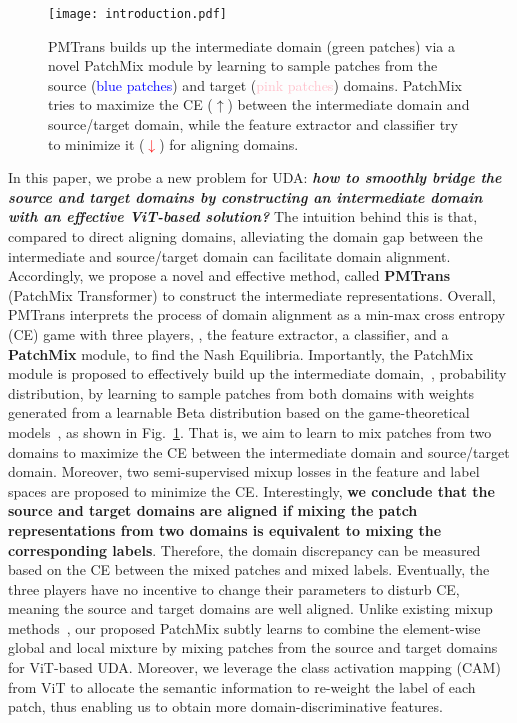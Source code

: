\documentclass[10pt,twocolumn,letterpaper, ]{article}
\begin{document}
\begin{figure}
    \centering
    \texttt{[image: introduction.pdf]}
    \captionsetup{font=small}
    \vspace{-8pt}
    \caption{PMTrans builds up the intermediate domain (\textcolor{green(pigment)}{green patches}) via a novel PatchMix module by learning to sample patches from the source (\textcolor{blue}{blue patches}) and target (\textcolor{pink}{pink patches}) domains. PatchMix tries to maximize the CE (\textcolor{green(pigment)}{$\uparrow$}) between the intermediate domain and source/target domain, while the feature extractor and classifier try to minimize it (\textcolor{red}{$\downarrow$}) for aligning domains.}
    \label{fig:cover_mix}
    \vspace{-15pt}
\end{figure}
In this paper, we probe a new problem for UDA: \textbf{\textit{how to smoothly bridge the source and target domains by constructing an intermediate domain with an effective ViT-based solution?}}
The intuition behind this is that, compared to direct aligning domains,  
alleviating the domain gap between the intermediate and source/target domain can facilitate domain alignment. 
Accordingly, we propose a novel and effective method, called \textbf{PMTrans} (PatchMix Transformer) to construct the intermediate representations. 
Overall, PMTrans interprets the process of domain alignment as a min-max cross entropy (CE) game with three players, \ie, the feature extractor, a classifier, and a \textbf{PatchMix} module, to find the Nash Equilibria. Importantly, the PatchMix module is proposed to effectively build up the intermediate domain,~\ie, probability distribution, by learning to sample patches from both domains with weights generated from a learnable Beta distribution based on the game-theoretical models~\cite{abs-2202-05352, bacsar1998dynamic, MazumdarRS20}, as shown in Fig.~\ref{fig:cover_mix}. That is, we aim to learn to mix patches from two domains to maximize the CE between the intermediate domain and source/target domain. Moreover, two semi-supervised mixup losses in the feature and label spaces are proposed to minimize the CE. Interestingly, \textbf{we conclude that the source and target domains are aligned if mixing the patch representations from two domains is equivalent to mixing the corresponding labels}. Therefore, the domain discrepancy can be measured based on the CE between the mixed patches and mixed labels. Eventually, the three players have no incentive to change their parameters to disturb CE, meaning the source and target domains are well aligned. Unlike existing mixup methods~\cite{ZhangCDL18, YunHCOYC19, UddinMSCB21}, our proposed PatchMix subtly learns to combine the element-wise global and local mixture by mixing patches from the source and target domains for ViT-based UDA. Moreover, we leverage the class activation mapping (CAM) from ViT to allocate the semantic information to re-weight the label of each patch, thus enabling us to obtain more domain-discriminative features. 
\end{document}
